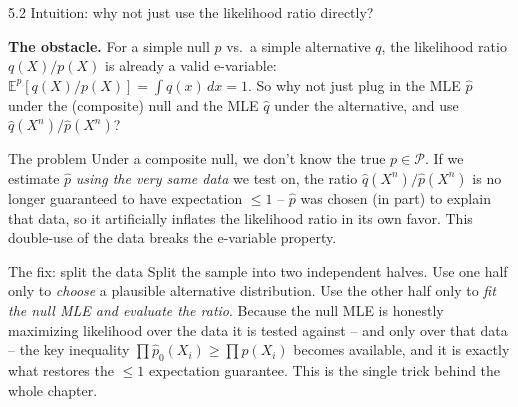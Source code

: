 \documentclass[aspectratio=169,10pt]{beamer}
\newcommand{\E}{\mathbb{E}}
\newcommand{\calP}{\mathcal{P}}
\begin{document}
\begin{frame}{5.2 Intuition: why not just use the likelihood ratio directly?}

  \textbf{The obstacle.} For a simple null $p$ vs.\ a simple
  alternative $q$, the likelihood ratio $q(X)/p(X)$ is already a valid
  e-variable: $\E^p[q(X)/p(X)] = \int q(x)\,dx = 1$. So why not just
  plug in the MLE $\hat p$ under the (composite) null and the MLE
  $\hat q$ under the alternative, and use $\hat q(X^n)/\hat p(X^n)$?

  \begin{alertblock}{The problem}
    Under a composite null, we don't know the true $p \in \calP$. If we
    estimate $\hat p$ \emph{using the very same data} we test on, the
    ratio $\hat q(X^n)/\hat p(X^n)$ is no longer guaranteed to have
    expectation $\le 1$ -- $\hat p$ was chosen (in part) to explain that
    data, so it artificially inflates the likelihood ratio in its own
    favor. This double-use of the data breaks the e-variable property.
  \end{alertblock}

  \begin{block}{The fix: split the data}
    Split the sample into two independent halves. Use one half only to
    \emph{choose} a plausible alternative distribution. Use the other
    half only to \emph{fit the null MLE and evaluate the ratio}. Because
    the null MLE is honestly maximizing likelihood over the data it is
    tested against -- and only over that data -- the key inequality
    $\prod \hat p_0(X_i) \ge \prod p(X_i)$ becomes available, and it is
    exactly what restores the $\le 1$ expectation guarantee. This is the
    single trick behind the whole chapter.
  \end{block}

\end{frame}
\end{document}
